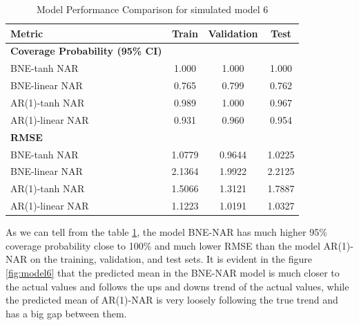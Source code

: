\documentclass{article}
\begin{document}
\begin{table}[htbp]
\centering
\caption{Model Performance Comparison for simulated model 6}
\label{tab:model6_comparison}
\begin{tabular}{lccc}
\toprule
\textbf{Metric} & \textbf{Train} & \textbf{Validation} & \textbf{Test} \\
\midrule
\textbf{Coverage Probability (95\% CI)} & & & \\
BNE-tanh NAR & 1.000 & 1.000 & 1.000 \\
BNE-linear NAR & 0.765 & 0.799 & 0.762 \\
AR(1)-tanh NAR & 0.989 & 1.000 & 0.967 \\
AR(1)-linear NAR & 0.931 & 0.960 & 0.954 \\
\midrule
\textbf{RMSE} & & & \\
BNE-tanh NAR & 1.0779 & 0.9644 & 1.0225 \\
BNE-linear NAR & 2.1364 & 1.9922 & 2.2125 \\
AR(1)-tanh NAR & 1.5066 & 1.3121 & 1.7887 \\
AR(1)-linear NAR & 1.1223 & 1.0191 & 1.0327 \\
\bottomrule
\end{tabular}
\end{table}

As we can tell from the table \ref{tab:model6_comparison}, the model BNE-NAR has much higher 95\% coverage probability close to 100\% and much lower RMSE than the model AR(1)-NAR on the training, validation, and test sets. It is evident in the figure \ref{fig:model6} that the predicted mean in the BNE-NAR model is much closer to the actual values and follows the ups and downs trend of the actual values, while the predicted mean of AR(1)-NAR is very loosely following the true trend and has a big gap between them. 

\newpage
\end{document}
